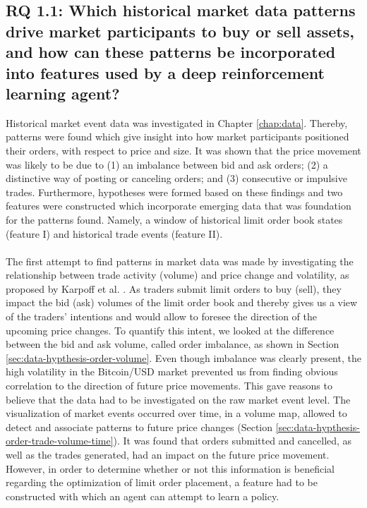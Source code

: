 \subsection{RQ 1.1: Which historical market data patterns drive market participants to buy or sell assets, and how can these patterns be incorporated into features used by a deep reinforcement learning agent?}

    Historical market event data was investigated in Chapter \ref{chap:data}. 
    Thereby, patterns were found which give insight into how market participants positioned their orders, with respect to price and size. 
    It was shown that the price movement was likely to be due to (1) an imbalance between bid and ask orders; (2) a distinctive way of posting or canceling orders; and (3) consecutive or impulsive trades.
    Furthermore, hypotheses were formed based on these findings and two features were constructed which incorporate emerging data that was foundation for the patterns found.
    Namely, a window of historical limit order book states (feature I) and historical trade events (feature II).
    \\
    \\
The first attempt to find patterns in market data was made by investigating the relationship between trade activity (volume) and price change and volatility, as proposed by Karpoff et al. \cite{karpoff1987relation}.  
As traders submit limit orders to buy (sell), they impact the bid (ask) volumes of the  limit order book and thereby gives us a view of the traders’ intentions and would allow  to foresee the direction of the upcoming price changes.
To quantify this intent, we looked at the difference between the bid and ask volume, called order imbalance, as shown in Section \ref{sec:data-hypthesis-order-volume}.
Even though imbalance was clearly present, the high volatility in the Bitcoin/USD market prevented us from finding obvious correlation to the direction of future price movements.
This gave reasons to believe that the data had to be investigated on the raw market event level\cite{kane2011analyzing}.
The visualization of market events occurred over time, in a volume map, allowed to detect and associate patterns to future price changes (Section \ref{sec:data-hypthesis-order-trade-volume-time}).
It was found that orders submitted and cancelled, as well as the trades generated, had an impact on the future price movement.
However, in order to determine whether or not this information is beneficial regarding the optimization of limit order placement, a feature had to be constructed with which an agent can attempt to learn a policy.
